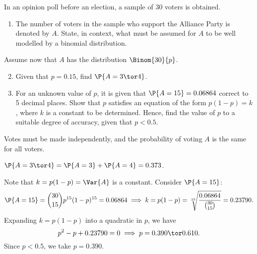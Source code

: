 \begin{problem}
    In an opinion poll before an election, a sample of 30 voters is obtained.
    \begin{enumerate}
        \item The number of voters in the sample who support the Alliance Party is denoted by $A$. State, in context, what must be assumed for $A$ to be well modelled by a binomial distribution.
    \end{enumerate}
    Assume now that $A$ has the distribution $\Binom{30}{p}$.
    \begin{enumerate}
        \setcounter{enumi}{1}
        \item Given that $p = 0.15$, find $\P{A = 3 \tor 4}$.
        \item For an unknown value of $p$, it is given that $\P{A = 15} = 0.06864$ correct to 5 decimal places. Show that $p$ satisfies an equation of the form $p(1-p)=k$, where $k$ is a constant to be determined. Hence, find the value of $p$ to a suitable degree of accuracy, given that $p<0.5$.
    \end{enumerate}
\end{problem}
\begin{solution}
    \begin{ppart}
        Votes must be made independently, and the probability of voting $A$ is the same for all voters.
    \end{ppart}
    \begin{ppart}
        $\P{A = 3 \tor 4} = \P{A = 3} + \P{A = 4} = 0.373$.
    \end{ppart}
    \begin{ppart}
        Note that $k = p(1- p) = \Var{A}$ is a constant. Consider $\P{A = 15}$: \[\P{A = 15} = \binom{30}{15} p^{15} (1-p)^{15} = 0.06864 \implies k = p(1-p) = \sqrt[15]{\frac{0.06864}{\binom{30}{15}}} = 0.23790.\] Expanding $k = p(1-p)$ into a quadratic in $p$, we have \[p^2 - p + 0.23790 = 0 \implies p = 0.390 \tor 0.610.\] Since $p < 0.5$, we take $p = 0.390$.
    \end{ppart}
\end{solution}

